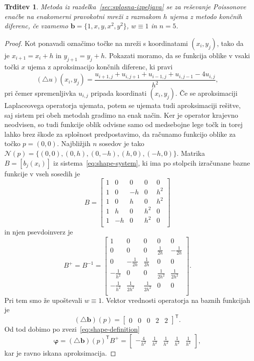 \documentclass[12pt,a4paper,twoside]{article}
\theoremstyle{definition} %
\theoremstyle{plain} %
\newtheorem{trditev}[definicija]{Trditev}
\numberwithin{equation}{section}
\newcommand{\Nc}{\mathcal{N}}
\newcommand{\T}{\mathsf{T}}
\newcommand{\lap}{\triangle}
\renewcommand{\b}{\boldsymbol}
\renewcommand{\phi}{\varphi}
\begin{document}
\begin{trditev}
  \label{trd:eq-to-fdm}
  Metoda iz razdelka~\ref{sec:splosna-izpeljava} se za reševanje Poissonove
  enačbe na enakomerni pravokotni mreži z razmakom $h$ ujema z metodo končnih
  diferenc, če vzamemo $\b{b} = \{1, x, y, x^2, y^2\}$, $w \equiv 1$ in
  $n=5$.
\end{trditev}
\begin{proof}
Kot ponavadi označimo točke na mreži s koordinatami $(x_i, y_j)$, tako da je
$x_{i+1} = x_i + h$ in $y_{j+1} = y_j + h$.
Pokazati moramo, da se funkcija oblike v vsaki točki $x$ ujema z aproksimacijo
končnih diferenc,
ki pravi
\[
  (\lap u)(x_i, y_j) = \frac{u_{i+1,j} + u_{i, j+1} + u_{i-1,j} + u_{i, j-1} -
  4u_{i,j}}{h^2},
\]
pri čemer spremenljivka $u_{i, j}$ pripada koordinati $(x_i, y_j)$. Če se
aproksimaciji Laplaceovega operatorja ujemata, potem se ujemata tudi
aproksimaciji rešitve, saj sistem pri obeh metodah gradimo na enak način.
Ker je operator krajevno neodvisen, so tudi funkcije oblik odvisne samo od
medsebojne lege točk in torej lahko brez škode
za splošnost predpostavimo, da računamo funkcijo oblike za točko
$p = (0, 0)$. Najbližjih $n$ sosedov je tako $\Nc(p) = \{(0, 0), (0, h), (0, -h),
(h, 0), (-h, 0)\}$. Matrika $B = [b_j(x_i)]$ iz sistema~\eqref{eq:shape-system},
ki ima po stolpcih izračunane bazne funkcije v vseh sosedih je
\[
  B =
  \begin{bmatrix}
    1 & 0 & 0 & 0 & 0 \\
    1 & 0 & -h & 0 & h^2 \\
    1 & 0 & h & 0 & h^2 \\
    1 & h & 0 & h^2 & 0 \\
    1 & -h & 0 & h^2 & 0 \\
  \end{bmatrix}
\]
in njen psevdoinverz je
\[
  B^+ = B^{-1} =
  \begin{bmatrix}
     1 & 0 & 0 & 0 & 0 \\
 0 & 0 & 0 & \frac{1}{2 h} & -\frac{1}{2 h} \\
 0 & -\frac{1}{2 h} & \frac{1}{2 h} & 0 & 0 \\
 -\frac{1}{h^2} & 0 & 0 & \frac{1}{2 h^2} & \frac{1}{2 h^2} \\
 -\frac{1}{h^2} & \frac{1}{2 h^2} & \frac{1}{2 h^2} & 0 & 0 \\
  \end{bmatrix}.
\]
Pri tem smo že upoštevali $w \equiv 1$.
Vektor vrednosti operatorja na baznih funkcijah je
\[
  (\lap \b{b})(p) =
\begin{bmatrix}
  0 & 0 & 0 & 2 & 2
\end{bmatrix}^\T.
\]
Od tod dobimo po zvezi~\eqref{eq:shape-definition}
\[
  \b\phi = (\lap \b b)(p)^\T B^{+} =
  \begin{bmatrix}
    -\frac{4}{h^2} & \frac{1}{h^2} & \frac{1}{h^2} & \frac{1}{h^2} &
    \frac{1}{h^2}
  \end{bmatrix},
\]
kar je ravno iskana aproksimacija.
\end{proof}
\end{document}
